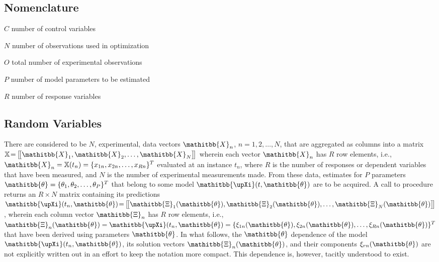 \documentclass[twocolumn,twoside,fleqn,12pt]{article}
\renewcommand{\normalfont}{\usefont{T1}{txr}{m}{n}}
\newcommand{\fonttt}[1]{\usefont{T1}{txtt}{m}{n}{#1}\normalfont}
\renewcommand{\texttt}[1]{\fonttt{#1}\xspace}
\newcommand{\ie}{i.e.,\xspace}
\newcommand{\vecMtx}[1]{\ensuremath{\mathitbb{#1}}}
\newcommand{\tenMtx}[1]{\ensuremath{\mathbb{#1}}}
\newcommand{\grkMtx}[1]{\ensuremath{\mathitbb{#1}}}
\newcommand{\namelistlabel}[1]{\mbox{#1}\hfil}
\newenvironment{namelist}[1]
   {\begin{list}{}%
      {\let\makelabel\namelistlabel%
       \settowidth{\labelwidth}{#1}%
       \setlength{\leftmargin}{1.1\labelwidth}%
       \setlength{\itemsep}{-6pt}%
      }%
   }{\end{list}%
}
\begin{document}
\subsection{Nomenclature}

\begin{namelist}{$\qquad$}
   \item[$C$] number of control variables
   \item[$N$] number of observations used in optimization
   \item[$O$] total number of experimental observations
   \item[$P$] number of model parameters to be estimated
   \item[$R$] number of response variables
\end{namelist}

\subsection{Random Variables}

There are considered to be $N$, experimental, data vectors $\vecMtx{X}_n$,
$n = 1,2,\dots,N$, that are aggregated as columns into a matrix $\tenMtx{X}
\! = \, \bigr[\!\bigl[ \vecMtx{X}_1 , \vecMtx{X}_2 , \dots , \vecMtx{X}_N
\bigl]\!\bigr]$ wherein each vector $\vecMtx{X}_n$ has $R$ row elements,
\ie $\vecMtx{X}_n = \tenMtx{X} ( t_n )  = \{ x_{1n} , x_{2n} ,
\dots , x_{Rn} \}^T$ evaluated at an instance $t_n$, where $R$ is the number
of responses or dependent variables that have been measured, and $N$
is the number of experimental measurements made.  From these data, estimates
for $P$ parameters $\grkMtx{\theta} = \{ \theta_1 , \theta_2 , \dots ,
\theta_P \}^T$ that belong to some model $\grkMtx{\upXi}(t,\grkMtx{\theta})$
are to be acquired.  A call to procedure \texttt{Theory} returns an $R \times N$
matrix containing its predictions $\grkMtx{\upXi} (t_n, \grkMtx{\theta} )
\! = \, \bigr[\!\bigl[ \grkMtx{\Xi}_1 (\grkMtx{\theta} ), \grkMtx{\Xi}_2
(\grkMtx{\theta} ), \dots , \grkMtx{\Xi}_N (\grkMtx{\theta} ) \bigl]\!\bigr]$,
wherein each column vector $\grkMtx{\Xi}_n$ has $R$ row elements, \ie
$\grkMtx{\Xi}_n(\grkMtx{\theta} ) = \grkMtx{\upXi} (t_n , \grkMtx{\theta}
) = \{ \xi_{1n} (\grkMtx{\theta} ) , \xi_{2n} (\grkMtx{\theta} ) , \dots ,
\xi_{Rn} (\grkMtx{\theta} ) \}^T$ that have been derived using parameters
$\grkMtx{\theta}$.  In what follows, the  $\grkMtx{\theta}$ dependence
of the model $\grkMtx{\upXi} (t_n , \grkMtx{\theta})$, its solution vectors
$\grkMtx{\Xi}_n (\grkMtx{\theta})$, and their components
$\xi_{rn} (\grkMtx{\theta})$ are not explicitly written out in an
effort to keep the notation more compact.  This dependence
is, however, tacitly understood to exist.
\end{document}
